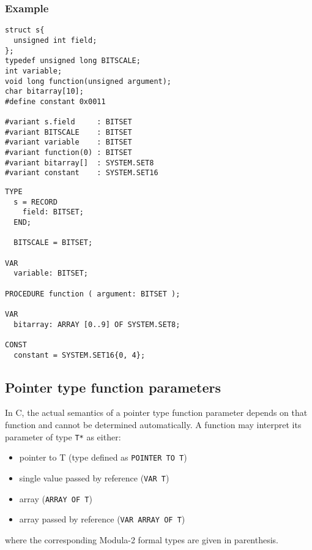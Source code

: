\subsubsection*{Example}

{\ifonline\else\small\fi
\begin{verbatim}
struct s{
  unsigned int field;
};
typedef unsigned long BITSCALE;
int variable;
void long function(unsigned argument);
char bitarray[10];
#define constant 0x0011

#variant s.field     : BITSET
#variant BITSCALE    : BITSET
#variant variable    : BITSET
#variant function(0) : BITSET
#variant bitarray[]  : SYSTEM.SET8
#variant constant    : SYSTEM.SET16
\end{verbatim}

\Sep %

\begin{verbatim}
TYPE
  s = RECORD
    field: BITSET;
  END;

  BITSCALE = BITSET;

VAR
  variable: BITSET;

PROCEDURE function ( argument: BITSET );

VAR
  bitarray: ARRAY [0..9] OF SYSTEM.SET8;

CONST
  constant = SYSTEM.SET16{0, 4};
\end{verbatim}
} %

\subsection{Pointer type function parameters}
\label{using:modrules:parameters}

In C, the actual semantics of a pointer type function parameter depends on
that function and cannot be determined automatically. A function
may interpret its parameter of type {\tt T*} as either:

\begin{itemize}
\item pointer to T (type defined as {\tt POINTER TO T})
\item single value passed by reference ({\tt VAR T})
\item array ({\tt ARRAY OF T})
\item array passed by reference ({\tt VAR ARRAY OF T})
\end{itemize}

where the corresponding Modula-2 formal types are given in parenthesis.

